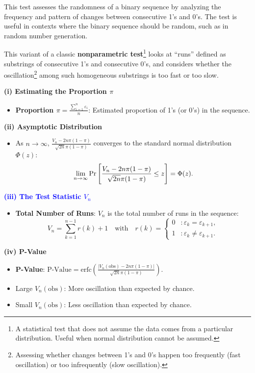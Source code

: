 \documentclass[12pt,openany]{book}
\theoremstyle{definition}
\begin{document}
	This test assesses the randomness of a binary sequence by analyzing the frequency and pattern of changes between consecutive 1's and 0's. The test is useful in contexts where the binary sequence should be random, such as in random number generation.
	
	This variant of a classic \textbf{nonparametric test}\footnote{A statistical test that does not assume the data comes from a particular distribution. Useful when normal distribution cannot be assumed.} looks at ``runs'' defined as substrings of consecutive 1's and consecutive 0's, and considers whether the oscillation\footnote{Assessing whether changes between 1's and 0's happen too frequently (fast oscillation) or too infrequently (slow oscillation).} among such homogeneous substrings is too fast or too slow.
	\vspace{12pt}
	\begin{tcolorbox}[colback=white,colframe=lemcolor,arc=5pt,title={\color{white}\bf Runs Test}]
		\textbf{(i) Estimating the Proportion \( \pi \)}
		\begin{itemize}
			\item \textbf{Proportion \(\displaystyle \pi=\frac{\sum_{i=1}^{n} \varepsilon_i}{n} \)}: Estimated proportion of 1's (or 0's) in the sequence.
		\end{itemize}
		
		\textbf{(ii) Asymptotic Distribution}
		\begin{itemize}
			\item As \( n\to\infty \), \( \frac{V_n - 2n\pi(1 - \pi)}{\sqrt{2n}\pi(1 - \pi)} \) converges to the standard normal distribution \( \Phi(z) \): \[
			\lim\limits_{n\to\infty}\Pr\sbr{\frac{V_n - 2n\pi(1 - \pi)}{\sqrt{2n}\pi(1 - \pi)}\leq z}=\Phi(z).
			\]
		\end{itemize}
		
		\textcolor{blue}{\bf (iii) The Test Statistic \( V_n \)}
		\begin{itemize}
			\item \textbf{Total Number of Runs}: \( V_n \) is the total number of runs in the sequence:\[
			V_n=\sum_{k=1}^{n-1}r(k)+1\quad\text{with}\quad r(k)=\begin{cases}
				0 &:\varepsilon_k=\varepsilon_{k+1},\\
				1 &:\varepsilon_k\neq\varepsilon_{k+1}.
			\end{cases}
			\]
		\end{itemize}
		
		\textbf{(iv) P-Value}
		\begin{itemize}
			\item \textbf{P-Value}: \(\text{P-Value} = \text{erfc}\left(\frac{|V_n(\text{obs}) - 2n\pi(1 - \pi)|}{\sqrt{2n}\pi(1 - \pi)}\right)\).
			\item Large \( V_n(\text{obs}) \): More oscillation than expected by chance.
			\item Small \( V_n(\text{obs}) \): Less oscillation than expected by chance.
		\end{itemize}
	\end{tcolorbox}
	
\end{document}
